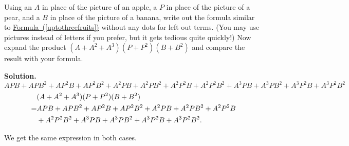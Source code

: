 \documentclass{book}
\begin{document}
\setcounter{project}{236}
\addtocounter{project}{-1}
\begin{activity}[]\label{twopiecesoffruit}
\hypertarget{p-1307}{}%
Using an \(A\) in place of the picture of an apple, a \(P\) in place of the picture of a pear, and a \(B\) in place of the picture of a banana, write out the formula similar to \hyperref[uptothreefruits]{Formula~(\ref{uptothreefruits})} without any dots for left out terms. (You may use pictures instead of letters if you prefer, but it gets tedious quite quickly!) Now expand the product \((A+A^2+A^3)(P+P^2)(B+B^2)\) and compare the result with your formula.%
\par\smallskip%
\noindent\textbf{Solution.}\hypertarget{solution-162}{}\quad%
\hypertarget{p-1308}{}%
\(APB+APB^2 +AP^2B+ AP^2B^2+ A^2PB+A^2PB^2+ A^2P^2B+ A^2P^2B^2+
A^3PB+A^3PB^2 +A^3P^2B+ A^3P^2B^2\)%
\begin{align*}
& (A+A^2+A^3)(P+P^2)(B+B^2)\\
=& APB+APB^2+AP^2B+AP^2B^2+A^2PB+A^2PB^2+A^2P^2B\\
& + A^2P^2B^2+
A^3PB+A^3PB^2+A^3P^2B+A^3P^2B^2.
\end{align*}
%
\par
\hypertarget{p-1309}{}%
We get the same expression in both cases.%
\end{activity}
\end{document}
